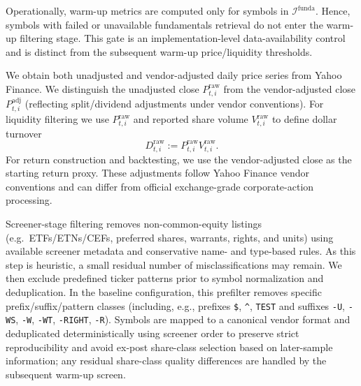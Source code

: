 \documentclass[11pt,a4paper]{article}
\begin{document}
Operationally, warm-up metrics are computed only for symbols in
$\mathcal{I}^{\mathrm{funda}}$. Hence, symbols with failed or unavailable
fundamentals retrieval do not enter the warm-up filtering stage. This gate is
an implementation-level data-availability control and is distinct from the
subsequent warm-up price/liquidity thresholds.

We obtain both unadjusted and vendor-adjusted daily price series from Yahoo Finance.
We distinguish the unadjusted close $P^{\mathrm{raw}}_{t,i}$ from the vendor-adjusted close
$P^{\mathrm{adj}}_{t,i}$ (reflecting split/dividend adjustments under vendor conventions).
For liquidity filtering we use $P^{\mathrm{raw}}_{t,i}$ and reported share volume
$V^{\mathrm{raw}}_{t,i}$ to define dollar turnover
\[
D^{\mathrm{raw}}_{t,i} := P^{\mathrm{raw}}_{t,i}V^{\mathrm{raw}}_{t,i}.
\]
For return construction and backtesting, we use the vendor-adjusted close as the starting return proxy.
These adjustments follow Yahoo Finance vendor conventions and can differ from
official exchange-grade corporate-action processing.

Screener-stage filtering removes non-common-equity listings (e.g.\ ETFs/ETNs/CEFs,
preferred shares, warrants, rights, and units) using available screener metadata
and conservative name- and type-based rules. As this step is heuristic, a small
residual number of misclassifications may remain. We then exclude predefined ticker
patterns prior to symbol normalization and deduplication. In the baseline
configuration, this prefilter removes specific prefix/suffix/pattern classes
(including, e.g., prefixes \texttt{\$}, \texttt{\textasciicircum}, \texttt{TEST}
and suffixes \texttt{-U}, \texttt{-WS}, \texttt{-W}, \texttt{-WT},
\texttt{-RIGHT}, \texttt{-R}). Symbols are mapped to a canonical vendor format
and deduplicated deterministically using screener order to preserve strict
reproducibility and avoid ex-post share-class selection based on later-sample
information; any residual share-class quality differences are handled by the
subsequent warm-up screen.
\end{document}
